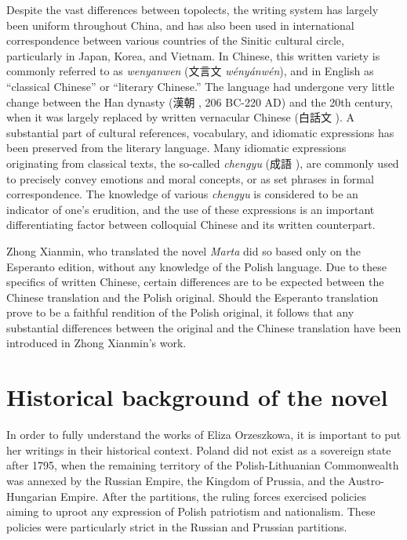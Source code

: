 Despite the vast differences between topolects, the writing system has largely been uniform throughout China, and has also been used in international correspondence between various countries of the Sinitic cultural circle, particularly in Japan, Korea, and Vietnam.
In Chinese, this written variety is commonly referred to as \textit{wenyanwen} (文言文 \textit{wényánwén}), and in English as ``classical Chinese'' or ``literary Chinese.''
The language had undergone very little change between the Han dynasty (漢朝 , 206 BC-220 AD) and the 20th century, when it was largely replaced by written vernacular Chinese (白話文 ).
A substantial part of cultural references, vocabulary, and idiomatic expressions has been preserved from the literary language.
Many idiomatic expressions originating from classical texts, the so-called \textit{chengyu} (成語 ), are commonly used to precisely convey emotions and moral concepts, or as set phrases in formal correspondence.
The knowledge of various \textit{chengyu} is considered to be an indicator of one's erudition, and the use of these expressions is an important differentiating factor between colloquial Chinese and its written counterpart.

Zhong Xianmin, who translated the novel \textit{Marta} did so based only on the Esperanto edition, without any knowledge of the Polish language.
Due to these specifics of written Chinese, certain differences are to be expected between the Chinese translation and the Polish original.
Should the Esperanto translation prove to be a faithful rendition of the Polish original, it follows that any substantial differences between the original and the Chinese translation have been introduced in Zhong Xianmin's work.

\section{Historical background of the novel}

In order to fully understand the works of Eliza Orzeszkowa, it is important to put her writings in their historical context.
Poland did not exist as a sovereign state after 1795, when the remaining territory of the Polish-Lithuanian Commonwealth was annexed by the Russian Empire, the  Kingdom of Prussia, and the Austro-Hungarian Empire.
After the partitions, the ruling forces exercised policies aiming to uproot any expression of Polish patriotism and nationalism. These policies were particularly strict in the Russian and Prussian partitions.


